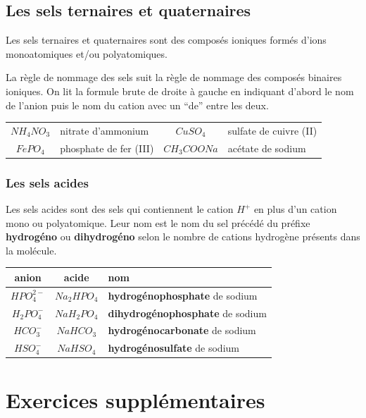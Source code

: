 \documentclass[
  11pt,
  french,
  a4paper,
  openany]{book}
\begin{document}
\hypertarget{les-sels-ternaires-et-quaternaires}{%
\subsection{Les sels ternaires et quaternaires}\label{les-sels-ternaires-et-quaternaires}}

Les sels ternaires et quaternaires sont des composés ioniques formés d'ions monoatomiques et/ou polyatomiques.

La règle de nommage des sels suit la règle de nommage des composés binaires ioniques. On lit la formule brute de droite à gauche en indiquant d'abord le nom de l'anion puis le nom du cation avec un ``de'' entre les deux.

\begin{longtable}[]{@{}clcl@{}}
\toprule
\endhead
\(NH_4NO_3\) & nitrate d'ammonium & \(CuSO_4\) & sulfate de cuivre (II)\tabularnewline
\(FePO_4\) & phosphate de fer (III) & \(CH_3COONa\) & acétate de sodium\tabularnewline
\bottomrule
\end{longtable}

\hypertarget{les-sels-acides}{%
\subsubsection{Les sels acides}\label{les-sels-acides}}

Les sels acides sont des sels qui contiennent le cation \(H^+\) en plus d'un cation mono ou polyatomique. Leur nom est le nom du sel précédé du préfixe \textbf{hydrogéno} ou \textbf{dihydrogéno} selon le nombre de cations hydrogène présents dans la molécule.

\begin{longtable}[]{@{}ccl@{}}
\toprule
anion & acide & nom\tabularnewline
\midrule
\endhead
\(HPO_4^{2-}\) & \(Na_2HPO_4\) & \textbf{hydrogénophosphate} de sodium\tabularnewline
\(H_2PO_4^-\) & \(NaH_2PO_4\) & \textbf{dihydrogénophosphate} de sodium\tabularnewline
\(HCO_3^-\) & \(NaHCO_3\) & \textbf{hydrogénocarbonate} de sodium\tabularnewline
\(HSO_4^-\) & \(NaHSO_4\) & \textbf{hydrogénosulfate} de sodium\tabularnewline
\bottomrule
\end{longtable}

\hypertarget{exercices-suppluxe9mentaires-6}{%
\section{Exercices supplémentaires}\label{exercices-suppluxe9mentaires-6}}
\end{document}
